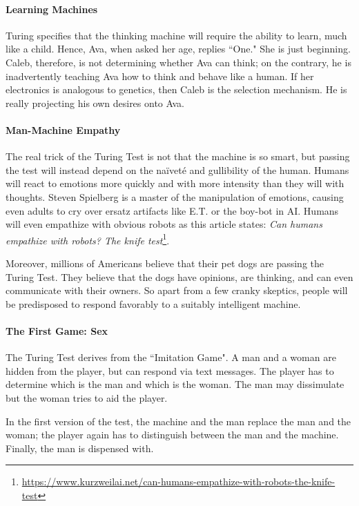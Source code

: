 \paragraph{Learning Machines}
Turing specifies that the thinking machine will require the ability to learn, much like a child. Hence, Ava, when asked
her age, replies ``One." She is just beginning. Caleb, therefore, is not determining whether Ava can think; on the
contrary, he is inadvertently teaching Ava how to think and behave like a human. If her electronics is analogous to
genetics, then Caleb is the selection mechanism. He is really projecting his own desires onto Ava.

\paragraph{Man-Machine Empathy}
The real trick of the Turing Test is not that the machine is so smart, but passing the test will instead depend on the
naïveté and gullibility of the human. Humans will react to emotions more quickly and with more intensity than they will
with thoughts. Steven Spielberg is a master of the manipulation of emotions, causing even adults to cry over ersatz
artifacts like E.T. or the boy-bot in AI. Humans will even empathize with obvious robots as this article states: \textit{Can
humans empathize with robots? The knife test}\footnote{\url{https://www.kurzweilai.net/can-humans-empathize-with-robots-the-knife-test}}.

Moreover, millions of Americans believe that their pet dogs are passing the Turing Test. They believe that the dogs have
opinions, are thinking, and can even communicate with their owners. So apart from a few cranky skeptics, people will be
predisposed to respond favorably to a suitably intelligent machine.

\paragraph{The First Game: Sex}
The Turing Test derives from the ``Imitation Game". A man and a woman are hidden from the player, but can respond via
text messages. The player has to determine which is the man and which is the woman. The man may dissimulate but the
woman tries to aid the player.

In the first version of the test, the machine and the man replace the man and the woman; the player again has to
distinguish between the man and the machine. Finally, the man is dispensed with.


